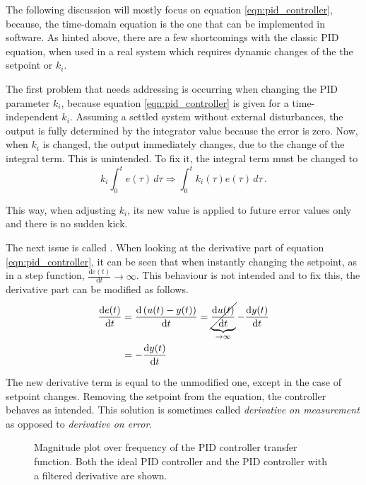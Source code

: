 The following discussion will mostly focus on equation \ref{eqn:pid_controller}, because, the time-domain equation is the one that can be implemented in software. As hinted above, there are a few shortcomings with the classic PID equation, when used in a real system which requires dynamic changes of the the setpoint or $k_i$.

The first problem that needs addressing is occurring when changing the PID parameter $k_i$, because equation \ref{eqn:pid_controller} is given for a time-independent $k_i$. Assuming a settled system without external disturbances, the output is fully determined by the integrator value because the error is zero. Now, when $k_i$ is changed, the output immediately changes, due to the change of the integral term. This is unintended. To fix it, the integral term must be changed to
\begin{equation}
    k_i \int_0^t e(\tau) \,d\tau \Rightarrow \int_0^t k_i(\tau) e(\tau) \,d\tau \,.
\end{equation}

This way, when adjusting $k_i$, its new value is applied to future error values only and there is no sudden kick.

The next issue is called . When looking at the derivative part of equation \ref{eqn:pid_controller}, it can be seen that when instantly changing the setpoint, as in a step function, $\frac{\mathrm{d}e(t)}{\mathrm{d}t} \to \infty$. This behaviour is not intended and to fix this, the derivative part can be modified as follows.
\begin{align}
    \frac{\mathrm{d}e(t)}{\mathrm{d}t} &= \frac{\mathrm{d}\left(u(t) - y(t)\right)}{\mathrm{d}t} = \underbrace{\cancel{\frac{\mathrm{d}u(t)}{\mathrm{d}t}}}_{\to \infty} - \frac{\mathrm{d}y(t)}{\mathrm{d}t} \nonumber\\
    &=- \frac{\mathrm{d}y(t)}{\mathrm{d}t}
\end{align}

The new derivative term is equal to the unmodified one, except in the case of setpoint changes. Removing the setpoint from the equation, the controller behaves as intended. This solution is sometimes called \textit{derivative on measurement} as opposed to \textit{derivative on error}.
\begin{figure}[hb]
    \centering
    
    \caption{Magnitude plot over frequency of the PID controller transfer function. Both the ideal PID controller and the PID controller with a filtered derivative are shown.}
    \label{fig:sim_pid_controller}
\end{figure}

